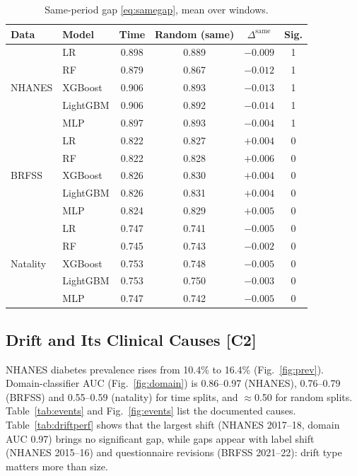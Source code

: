 \documentclass[journal,twoside,web]{ieeecolor}
\DeclareRobustCommand{\contrib}[1]{\textbf{\textcolor{contribframe}{[C#1]}}}
\newcommand{\Dgap}{\ensuremath{\Delta}}
\begin{document}
\begin{table}[!t]
\caption{Same-period gap \eqref{eq:samegap}, mean over windows.}
\label{tab:same}
\centering
\setlength{\tabcolsep}{4pt}
\begin{tabular}{@{}llcccc@{}}
\toprule
Data & Model & Time & Random (same) & $\Dgap^{\mathrm{same}}$ & Sig. \\
\midrule
\multirow{5}{*}{NHANES} & LR & 0.898 & 0.889 & $-0.009$ & 1 \\
 & RF & 0.879 & 0.867 & $-0.012$ & 1 \\
 & XGBoost & 0.906 & 0.893 & $-0.013$ & 1 \\
 & LightGBM & 0.906 & 0.892 & $-0.014$ & 1 \\
 & MLP & 0.897 & 0.893 & $-0.004$ & 1 \\
\midrule
\multirow{5}{*}{BRFSS} & LR & 0.822 & 0.827 & $+0.004$ & 0 \\
 & RF & 0.822 & 0.828 & $+0.006$ & 0 \\
 & XGBoost & 0.826 & 0.830 & $+0.004$ & 0 \\
 & LightGBM & 0.826 & 0.831 & $+0.004$ & 0 \\
 & MLP & 0.824 & 0.829 & $+0.005$ & 0 \\
\midrule
\multirow{5}{*}{Natality} & LR & 0.747 & 0.741 & $-0.005$ & 0 \\
 & RF & 0.745 & 0.743 & $-0.002$ & 0 \\
 & XGBoost & 0.753 & 0.748 & $-0.005$ & 0 \\
 & LightGBM & 0.753 & 0.750 & $-0.003$ & 0 \\
 & MLP & 0.747 & 0.742 & $-0.005$ & 0 \\
\bottomrule
\end{tabular}
\end{table}

\subsection{Drift and Its Clinical Causes \contrib{2}}
\label{sec:drift}
NHANES diabetes prevalence rises from 10.4\% to 16.4\% (Fig.~\ref{fig:prev}). Domain-classifier
AUC (Fig.~\ref{fig:domain}) is 0.86--0.97 (NHANES), 0.76--0.79 (BRFSS) and 0.55--0.59 (natality)
for time splits, and $\approx$0.50 for random splits. Table~\ref{tab:events} and
Fig.~\ref{fig:events} list the documented causes. Table~\ref{tab:driftperf} shows that the largest
shift (NHANES 2017--18, domain AUC 0.97) brings no significant gap, while gaps appear with label
shift (NHANES 2015--16) and questionnaire revisions (BRFSS 2021--22): drift type matters more than
size.
\end{document}
